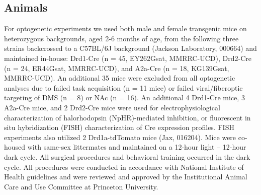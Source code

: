\subsection{Animals}
\label{sec:ap1:m1}
For optogenetic experiments we used both male and female transgenic mice on heterozygous backgrounds, aged 2-6 months of age, from the following three strains backcrossed to a C57BL/6J background (Jackson Laboratory, 000664) and maintained in-house: Drd1-Cre (n = 45, EY262Gsat, MMRRC-UCD), Drd2-Cre (n = 24, ER44Gsat, MMRRC-UCD), and A2a-Cre (n = 18, KG139Gsat, MMRRC-UCD). An additional 35 mice were excluded from all optogenetic analyses due to failed task acquisition (n = 11 mice) or failed viral/fiberoptic targeting of DMS (n = 8) or NAc (n = 16). An additional 4 Drd1-Cre mice, 3 A2a-Cre mice, and 2 Drd2-Cre mice were used for electrophysiological characterization of halorhodopsin (NpHR)-mediated inhibition, or fluorescent in situ hybridization (FISH) characterization of Cre expression profiles. FISH experiments also utilized 2 Drd1a-tdTomato mice (Jax, 016204). Mice were co-housed with same-sex littermates and maintained on a 12-hour light – 12-hour dark cycle. All surgical procedures and behavioral training occurred in the dark cycle. All procedures were conducted in accordance with National Institute of Health guidelines and were reviewed and approved by the Institutional Animal Care and Use Committee at Princeton University.